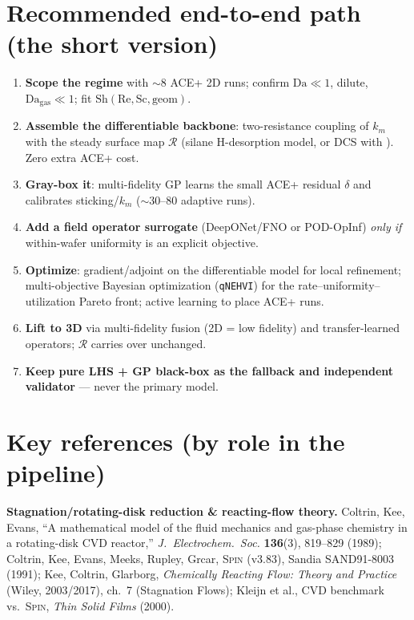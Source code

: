 \documentclass[11pt]{article}
\newcommand{\R}{\mathcal{R}}
\newcommand{\Da}{\mathrm{Da}}
\newcommand{\Sh}{\mathrm{Sh}}
\newcommand{\Rey}{\mathrm{Re}}
\newcommand{\Sc}{\mathrm{Sc}}
\begin{document}
\section*{Recommended end-to-end path (the short version)}
\begin{keybox}
\begin{enumerate}[leftmargin=1.5em,itemsep=2pt]
\item \textbf{Scope the regime} with $\sim$8 ACE+ 2D runs; confirm $\Da\ll1$, dilute, $\Da_{\text{gas}}\ll1$; fit $\Sh(\Rey,\Sc,\text{geom})$.
\item \textbf{Assemble the differentiable backbone}: two-resistance coupling of $k_m$ with the steady surface map $\R$ (silane H-desorption model, or DCS with ). Zero extra ACE+ cost.
\item \textbf{Gray-box it}: multi-fidelity GP learns the small ACE+ residual $\delta$ and calibrates sticking/$k_m$ ($\sim$30--80 adaptive runs).
\item \textbf{Add a field operator surrogate} (DeepONet/FNO or POD-OpInf) \emph{only if} within-wafer uniformity is an explicit objective.
\item \textbf{Optimize}: gradient/adjoint on the differentiable model for local refinement; multi-objective Bayesian optimization (\texttt{qNEHVI}) for the rate--uniformity--utilization Pareto front; active learning to place ACE+ runs.
\item \textbf{Lift to 3D} via multi-fidelity fusion (2D = low fidelity) and transfer-learned operators; $\R$ carries over unchanged.
\item \textbf{Keep pure LHS + GP black-box as the fallback and independent validator} --- never the primary model.
\end{enumerate}
\end{keybox}

\section*{Key references (by role in the pipeline)}
\footnotesize
\textbf{Stagnation/rotating-disk reduction \& reacting-flow theory.}
Coltrin, Kee, Evans, ``A mathematical model of the fluid mechanics and gas-phase chemistry in a rotating-disk CVD reactor,'' \emph{J.\ Electrochem.\ Soc.} \textbf{136}(3), 819--829 (1989);
Coltrin, Kee, Evans, Meeks, Rupley, Grcar, \textsc{Spin} (v3.83), Sandia SAND91-8003 (1991);
Kee, Coltrin, Glarborg, \emph{Chemically Reacting Flow: Theory and Practice} (Wiley, 2003/2017), ch.\ 7 (Stagnation Flows);
Kleijn et al., CVD benchmark vs.\ \textsc{Spin}, \emph{Thin Solid Films} (2000).
\end{document}
